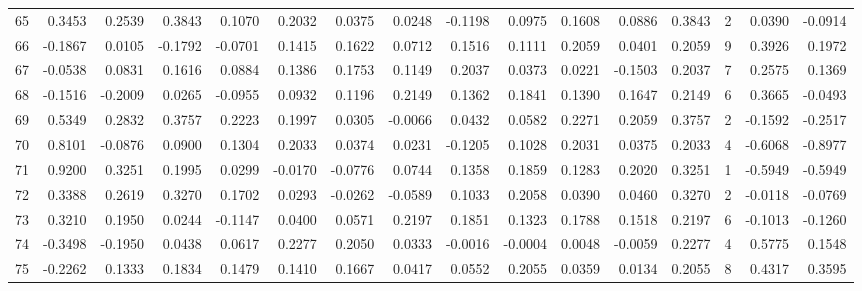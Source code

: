 \begin{tabular}{lrrrrrrrrrrrrrrr}
65  &      0.3453 &  0.2539 &  0.3843 &  0.1070 &  0.2032 &  0.0375 &  0.0248 & -0.1198 &  0.0975 &  0.1608 &   0.0886 &     0.3843 &      2 &                    0.0390 &                    -0.0914 \\
66  &     -0.1867 &  0.0105 & -0.1792 & -0.0701 &  0.1415 &  0.1622 &  0.0712 &  0.1516 &  0.1111 &  0.2059 &   0.0401 &     0.2059 &      9 &                    0.3926 &                     0.1972 \\
67  &     -0.0538 &  0.0831 &  0.1616 &  0.0884 &  0.1386 &  0.1753 &  0.1149 &  0.2037 &  0.0373 &  0.0221 &  -0.1503 &     0.2037 &      7 &                    0.2575 &                     0.1369 \\
68  &     -0.1516 & -0.2009 &  0.0265 & -0.0955 &  0.0932 &  0.1196 &  0.2149 &  0.1362 &  0.1841 &  0.1390 &   0.1647 &     0.2149 &      6 &                    0.3665 &                    -0.0493 \\
69  &      0.5349 &  0.2832 &  0.3757 &  0.2223 &  0.1997 &  0.0305 & -0.0066 &  0.0432 &  0.0582 &  0.2271 &   0.2059 &     0.3757 &      2 &                   -0.1592 &                    -0.2517 \\
70  &      0.8101 & -0.0876 &  0.0900 &  0.1304 &  0.2033 &  0.0374 &  0.0231 & -0.1205 &  0.1028 &  0.2031 &   0.0375 &     0.2033 &      4 &                   -0.6068 &                    -0.8977 \\
71  &      0.9200 &  0.3251 &  0.1995 &  0.0299 & -0.0170 & -0.0776 &  0.0744 &  0.1358 &  0.1859 &  0.1283 &   0.2020 &     0.3251 &      1 &                   -0.5949 &                    -0.5949 \\
72  &      0.3388 &  0.2619 &  0.3270 &  0.1702 &  0.0293 & -0.0262 & -0.0589 &  0.1033 &  0.2058 &  0.0390 &   0.0460 &     0.3270 &      2 &                   -0.0118 &                    -0.0769 \\
73  &      0.3210 &  0.1950 &  0.0244 & -0.1147 &  0.0400 &  0.0571 &  0.2197 &  0.1851 &  0.1323 &  0.1788 &   0.1518 &     0.2197 &      6 &                   -0.1013 &                    -0.1260 \\
74  &     -0.3498 & -0.1950 &  0.0438 &  0.0617 &  0.2277 &  0.2050 &  0.0333 & -0.0016 & -0.0004 &  0.0048 &  -0.0059 &     0.2277 &      4 &                    0.5775 &                     0.1548 \\
75  &     -0.2262 &  0.1333 &  0.1834 &  0.1479 &  0.1410 &  0.1667 &  0.0417 &  0.0552 &  0.2055 &  0.0359 &   0.0134 &     0.2055 &      8 &                    0.4317 &                     0.3595 \\

\end{tabular}
